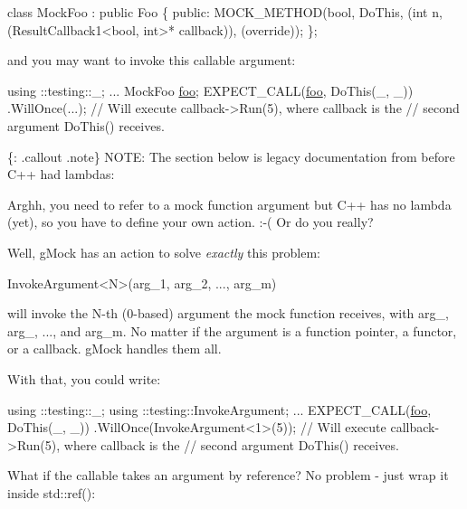 \begin{DoxyCode}
\textcolor{keyword}{class }MockFoo : \textcolor{keyword}{public} Foo \{
 \textcolor{keyword}{public}:
  MOCK\_METHOD(\textcolor{keywordtype}{bool}, DoThis, (\textcolor{keywordtype}{int} n, (ResultCallback1<bool, int>* callback)),
              (\textcolor{keyword}{override}));
\};
\end{DoxyCode}


and you may want to invoke this callable argument\+:


\begin{DoxyCode}
using ::testing::\_;
...
  MockFoo \mbox{\hyperlink{namespacefoo}{foo}};
  EXPECT\_CALL(\mbox{\hyperlink{namespacefoo}{foo}}, DoThis(\_, \_))
      .WillOnce(...);
      \textcolor{comment}{// Will execute callback->Run(5), where callback is the}
      \textcolor{comment}{// second argument DoThis() receives.}
\end{DoxyCode}


\{\+: .callout .note\} N\+O\+TE\+: The section below is legacy documentation from before C++ had lambdas\+:

Arghh, you need to refer to a mock function argument but C++ has no lambda (yet), so you have to define your own action. \+:-\/( Or do you really?

Well, g\+Mock has an action to solve {\itshape exactly} this problem\+:


\begin{DoxyCode}
InvokeArgument<N>(arg\_1, arg\_2, ..., arg\_m)
\end{DoxyCode}


will invoke the {\ttfamily N}-\/th (0-\/based) argument the mock function receives, with {\ttfamily arg\+\_}, {\ttfamily arg\+\_}, ..., and {\ttfamily arg\+\_\+m}. No matter if the argument is a function pointer, a functor, or a callback. g\+Mock handles them all.

With that, you could write\+:


\begin{DoxyCode}
using ::testing::\_;
using ::testing::InvokeArgument;
...
  EXPECT\_CALL(\mbox{\hyperlink{namespacefoo}{foo}}, DoThis(\_, \_))
      .WillOnce(InvokeArgument<1>(5));
      \textcolor{comment}{// Will execute callback->Run(5), where callback is the}
      \textcolor{comment}{// second argument DoThis() receives.}
\end{DoxyCode}


What if the callable takes an argument by reference? No problem -\/ just wrap it inside {\ttfamily std\+::ref()}\+:


